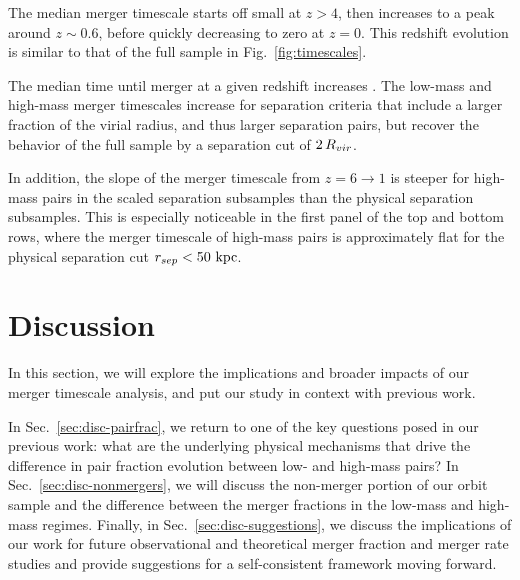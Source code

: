 \documentclass[twocolumn,linenumbers]{aastex631}
\begin{document}
        The median merger timescale starts off small at $z>4$, then increases to a peak around $z\sim0.6$, before quickly decreasing to zero at $z=0$. 
        This redshift evolution is similar to that of the full sample in Fig.~\ref{fig:timescales}.
        
        The median time until merger at a given redshift increases .
        The low-mass and high-mass merger timescales increase for separation criteria that include a larger fraction of the virial radius, and thus larger separation pairs, but recover the behavior of the full sample by a separation cut of $2\,R_{vir}$.
        
        In addition, the slope of the merger timescale from $z=6\to1$ is steeper for high-mass pairs in the scaled separation subsamples than the physical separation subsamples.
        This is especially noticeable in the first panel of the top and bottom rows, where the merger timescale of high-mass pairs is approximately flat for the physical separation cut $r_{sep}<50\,\mathrm{\,kpc}$. 

\section{Discussion} \label{sec:discussion}
    In this section, we will explore the implications and broader impacts of our merger timescale analysis, and put our study in context with previous work. 

    In Sec.~\ref{sec:disc-pairfrac}, we return to one of the key questions posed in our previous work: what are the underlying physical mechanisms that drive the difference in pair fraction evolution between low- and high-mass pairs? 
    In Sec.~\ref{sec:disc-nonmergers}, we will discuss the non-merger portion of our orbit sample and the difference between the merger fractions in the low-mass and high-mass regimes.
    Finally, in Sec.~\ref{sec:disc-suggestions}, we discuss the implications of our work for future observational and theoretical merger fraction and merger rate studies and provide suggestions for a self-consistent framework moving forward.
\end{document}
